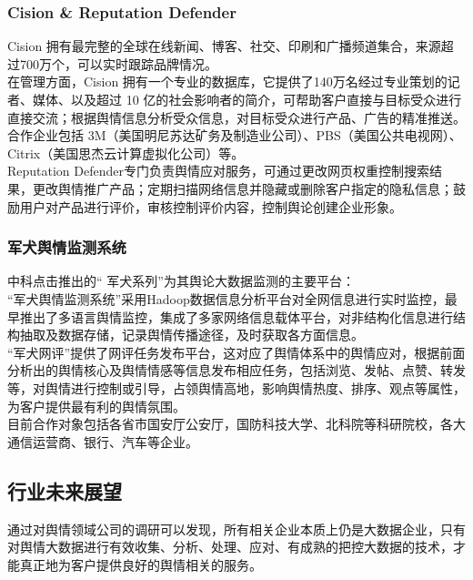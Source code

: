 \documentclass[11pt,a4paper,utf8]{article}
\begin{document}
\subsubsection{Cision & Reputation Defender}
Cision 拥有最完整的全球在线新闻、博客、社交、印刷和广播频道集合，来源超过700万个，可以实时跟踪品牌情况。\\

在管理方面，Cision 拥有一个专业的数据库，它提供了140万名经过专业策划的记者、媒体、以及超过 10 亿的社会影响者的简介，可帮助客户直接与目标受众进行直接交流；根据舆情信息分析受众信息，对目标受众进行产品、广告的精准推送。 \\

合作企业包括 3M（美国明尼苏达矿务及制造业公司）、PBS（美国公共电视网）、Citrix（美国思杰云计算虚拟化公司）等。 \\

Reputation Defender专门负责舆情应对服务，可通过更改网页权重控制搜索结果，更改舆情推广产品；定期扫描网络信息并隐藏或删除客户指定的隐私信息；鼓励用户对产品进行评价，审核控制评价内容，控制舆论创建企业形象。\\

\subsubsection{军犬舆情监测系统}
中科点击推出的“ 军犬系列”为其舆论大数据监测的主要平台：\\

“军犬舆情监测系统”采用Hadoop数据信息分析平台对全网信息进行实时监控，最早推出了多语言舆情监控，集成了多家网络信息载体平台，对非结构化信息进行结构抽取及数据存储，记录舆情传播途径，及时获取各方面信息。\\

“军犬网评”提供了网评任务发布平台，这对应了舆情体系中的舆情应对，根据前面分析出的舆情核心及舆情情感等信息发布相应任务，包括浏览、发帖、点赞、转发等，对舆情进行控制或引导，占领舆情高地，影响舆情热度、排序、观点等属性，为客户提供最有利的舆情氛围。\\

目前合作对象包括各省市国安厅公安厅，国防科技大学、北科院等科研院校，各大通信运营商、银行、汽车等企业。\\




\subsection{行业未来展望}
通过对舆情领域公司的调研可以发现，所有相关企业本质上仍是大数据企业，只有对舆情大数据进行有效收集、分析、处理、应对、有成熟的把控大数据的技术，才能真正地为客户提供良好的舆情相关的服务。 \\ 
\end{document}
